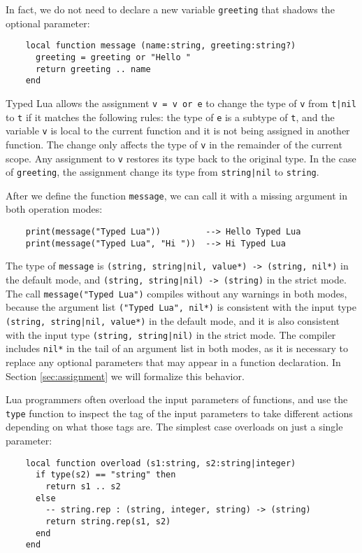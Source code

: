 In fact, we do not need to declare a new variable \texttt{greeting} that
shadows the optional parameter:
\begin{verbatim}
    local function message (name:string, greeting:string?)
      greeting = greeting or "Hello "
      return greeting .. name
    end
\end{verbatim}

Typed Lua allows the assignment \texttt{v = v or e} to change
the type of \texttt{v} from \texttt{t|nil} to \texttt{t}
if it matches the following rules: 
the type of \texttt{e} is a subtype of \texttt{t},
and the variable \texttt{v} is local to the current function
and it is not being assigned in another function.
The change only affects the type of \texttt{v} in the remainder
of the current scope.
Any assignment to \texttt{v} restores its type back to the
original type.
In the case of \texttt{greeting}, the assignment change its type
from \texttt{string|nil} to \texttt{string}. 

After we define the function \texttt{message}, we can call it
with a missing argument in both operation modes:
\begin{verbatim}
    print(message("Typed Lua"))         --> Hello Typed Lua
    print(message("Typed Lua", "Hi "))  --> Hi Typed Lua
\end{verbatim}

The type of \texttt{message} is
\texttt{(string, string|nil, value*) -> (string, nil*)}
in the default mode, and
\texttt{(string, string|nil) -> (string)}
in the strict mode.
The call \texttt{message("Typed Lua")} compiles without
any warnings in both modes, because the argument list
\texttt{("Typed Lua", nil*)} is consistent with the input type
\texttt{(string, string|nil, value*)} in the default mode,
and it is also consistent with the input type 
\texttt{(string, string|nil)} in the strict mode.
The compiler includes \texttt{nil*} in the tail of
an argument list in both modes, as it is necessary
to replace any optional parameters that may appear in
a function declaration.
In Section \ref{sec:assignment} we will formalize this behavior.

Lua programmers often overload the input parameters of functions,
and use the \texttt{type} function to inspect the tag of the
input parameters to take different actions depending on what
those tags are.
The simplest case overloads on just a single parameter:
\begin{verbatim}
    local function overload (s1:string, s2:string|integer)
      if type(s2) == "string" then
        return s1 .. s2
      else
        -- string.rep : (string, integer, string) -> (string)
        return string.rep(s1, s2)
      end
    end
\end{verbatim}

